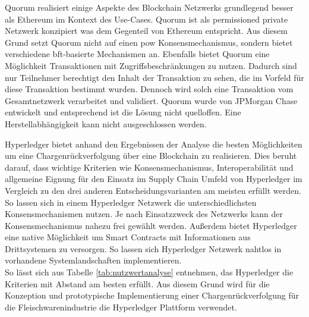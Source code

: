 Quorum realisiert einige Aspekte des Blockchain Netzwerks grundlegend besser als Ethereum im Kontext des Use-Cases. Quorum ist als permissioned private Netzwerk konzipiert was dem Gegenteil von Ethereum entspricht. Aus diesem Grund setzt Quorum nicht auf einen \ac{pow} Konsensmechanismus, sondern bietet verschiedene \ac{bft}-basierte Mechanismen an. Ebenfalls bietet Quorum eine Möglichkeit Transaktionen mit Zugriffsbeschränkungen zu nutzen. Dadurch sind nur Teilnehmer berechtigt den Inhalt der Transaktion zu sehen, die im Vorfeld für diese Transaktion bestimmt wurden. Dennoch wird solch eine Transaktion vom Gesamtnetzwerk verarbeitet und validiert. Quorum wurde von JPMorgan Chase entwickelt und entsprechend ist die Lösung nicht quelloffen. Eine Herstellabhängigkeit kann nicht ausgeschlossen werden.

Hyperledger bietet anhand den Ergebnissen der Analyse die besten Möglichkeiten um eine Chargenrückverfolgung über eine Blockchain zu realisieren. Dies beruht darauf, dass wichtige Kriterien wie Konsensmechanismus, Interoperabilität und allgemeine Eignung für den Einsatz im Supply Chain Umfeld von Hyperledger im Vergleich zu den drei anderen Entscheidungsvarianten am meisten erfüllt werden. So lassen sich in einem Hyperledger Netzwerk die unterschiedlichsten Konsensmechanismen nutzen. Je nach Einsatzzweck des Netzwerks kann der Konsensmechanismus nahezu frei gewählt werden. Außerdem bietet Hyperledger eine native Möglichkeit um Smart Contracts mit Informationen aus Drittsystemen zu versorgen. So lassen sich Hyperledger Netzwerk nahtlos in vorhandene Systemlandschaften implementieren.\\

So lässt sich aus Tabelle \ref{tab:nutzwertanalyse} entnehmen, das Hyperledger die Kriterien mit Abstand am besten erfüllt. Aus diesem Grund wird für die Konzeption und prototypische Implementierung einer Chargenrückverfolgung für die Fleischwarenindustrie die Hyperledger Plattform verwendet.

